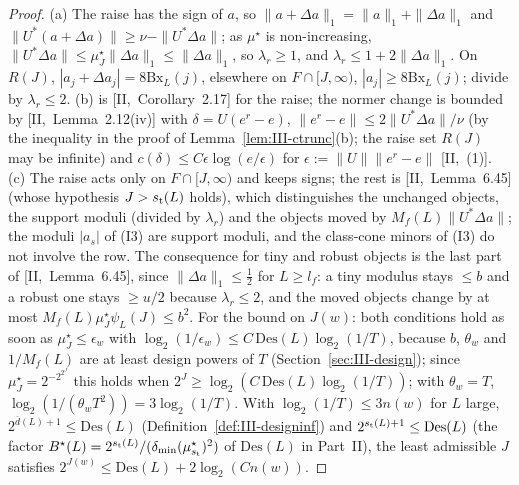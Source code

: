 \documentclass[10pt]{amsart}
\theoremstyle{definition}
\theoremstyle{remark}
\begin{document}
\begin{proof}
(a) The raise has the sign of $a$, so $\|a+\Delta a\|_1=\|a\|_1+\|\Delta a\|_1$
and $\|U^*(a+\Delta a)\|\ge\nu-\|U^*\Delta a\|$; as $\mu^\star$ is non-increasing,
$\|U^*\Delta a\|\le\mu^\star_J\|\Delta a\|_1\le\|\Delta a\|_1$, so $\lambda_r\ge1$,
and $\lambda_r\le1+2\|\Delta a\|_1$.  On $R(J)$, $|a_j+\Delta a_j|=8\mathrm{Bx}_L(j)$,
elsewhere on $F\cap[J,\infty)$, $|a_j|\ge8\mathrm{Bx}_L(j)$; divide by
$\lambda_r\le2$.  (b) is [II,~Corollary~2.17] for the raise; the normer
change is bounded by [II,~Lemma~2.12(iv)] with $\delta=U(e^r-e)$, $\|e^r-e\|
\le2\|U^*\Delta a\|/\nu$ (by the inequality in the proof of
Lemma~\ref{lem:III-ctrunc}(b); the raise set $R(J)$ may be infinite) and $c(\delta)\le
C\epsilon\log(e/\epsilon)$ for $\epsilon:=\|U\|\|e^r-e\|$ [II,~(1)].  (c) The
raise acts only on $F\cap[J,\infty)$ and keeps signs; the rest is
[II,~Lemma~6.45] (whose hypothesis $J>s_{\rm t}(L)$ holds), which distinguishes
the unchanged objects, the support moduli (divided by $\lambda_r$) and the
objects moved by $M_f(L)\|U^*\Delta a\|$; the moduli $|a_s|$ of (I3) are
support moduli, and the class-cone minors of (I3) do not involve the row.
The consequence for tiny and robust objects is the last part of
[II,~Lemma~6.45], since $\|\Delta a\|_1\le\frac12$ for $L\ge l_f$: a tiny
modulus stays $\le b$ and a robust one stays $\ge u/2$ because
$\lambda_r\le2$, and the moved objects change by at most
$M_f(L)\mu^\star_J\psi_L(J)\le b^2$.  For the bound on $J(w)$: both
conditions hold as soon as $\mu^\star_J\le\epsilon_w$ with $\log_2(1/\epsilon_w)
\le C\,\mathrm{Des}(L)\log_2(1/T)$, because $b$, $\theta_w$ and
$1/M_f(L)$ are at least design powers of $T$ (Section~\ref{sec:III-design});
since $\mu^\star_J=2^{-2^{2^J}}$ this holds when $2^J\ge\log_2(C\,\mathrm{Des}
(L)\log_2(1/T))$; with $\theta_w=T$, $\log_2(1/(\theta_wT^2))=3\log_2(1/T)$.
With $\log_2(1/T)\le3n(w)$ for $L$ large, $2^{\bar d(L)+1}\le\mathrm{Des}(L)$
(Definition~\ref{def:III-designinf}) and $2^{s_{\rm t}(L)+1}\le\mathrm{Des}(L)$
(the factor $B^\star(L)=2^{s_{\rm t}(L)}/(\delta_{\min}(\mu^\star_{s_{\rm t}})^2)$ of
$\mathrm{Des}(L)$ in Part~II), the
least admissible $J$ satisfies $2^{J(w)}\le\mathrm{Des}(L)+2\log_2(Cn(w))$.
\end{proof}
\end{document}
